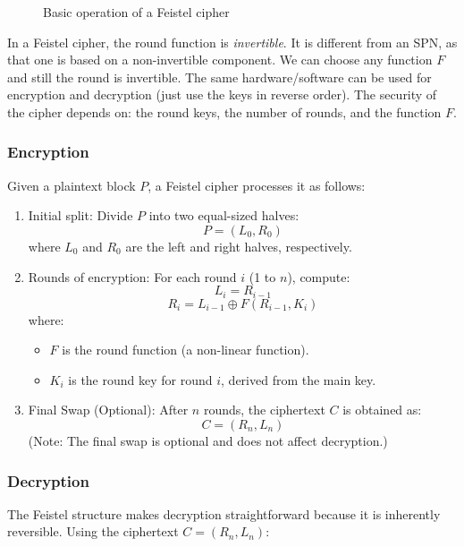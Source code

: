 \begin{figure}[h!]
\begin{minipage}[t]{0.45\textwidth}
        \caption{Basic operation of a Feistel cipher}
    \end{minipage}
\end{figure}

In a Feistel cipher, the round function is \emph{invertible}. It is different from an SPN, as that one is based on a non-invertible component. We can choose any function $F$ and still the round is invertible.
The same hardware/software can be used for encryption and decryption (just use the keys in reverse order). The security of the cipher depends on: the round keys, the number of rounds, and the function $F$.

\subsubsection{Encryption}
Given a plaintext block \( P \), a Feistel cipher processes it as follows:

\begin{enumerate}
    \item Initial split: Divide \( P \) into two equal-sized halves:
    \[
    P = (L_0, R_0)
    \]
    where \( L_0 \) and \( R_0 \) are the left and right halves, respectively.

    \item Rounds of encryption: For each round \( i \) (1 to \( n \)), compute:
    \[
    L_i = R_{i-1}
    \]
    \[
    R_i = L_{i-1} \oplus F(R_{i-1}, K_i)
    \]
    where:
    \begin{itemize}
        \item \( F \) is the round function (a non-linear function).
        \item \( K_i \) is the round key for round \( i \), derived from the main key.
    \end{itemize}

    \item Final Swap (Optional): After \( n \) rounds, the ciphertext \( C \) is obtained as:
    \[
    C = (R_n, L_n)
    \]
    (Note: The final swap is optional and does not affect decryption.)
\end{enumerate}

\subsubsection{Decryption}

The Feistel structure makes decryption straightforward because it is inherently reversible. Using the ciphertext \( C = (R_n, L_n) \):

